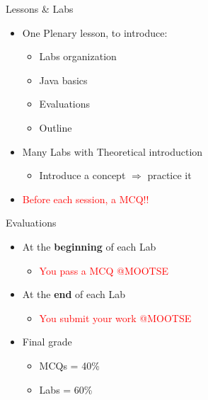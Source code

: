 \documentclass[English,t,%
hyperref={%
    pdftitle={FISA-DE2 OOP in Java},%
    pdfauthor={Guillaume Muller},%
    pdfsubject={OOP in Java},%
    pdfkeywords={OOP,Java}%
    },%
xcolor={pdftex,svgnames} %
]{beamer}
\begin{document}
\begin{frame}{Lessons \& Labs}

  \begin{itemize}
%
    \item One Plenary lesson, to introduce:
    \vspace{.5em}
    \begin{itemize}
      \item Labs organization
      \item Java basics
      \item Evaluations
      \item Outline
    \end{itemize}
%
    \vspace{2em}
    \item Many Labs with Theoretical introduction
    \vspace{.5em}
    \begin{itemize}
      \item Introduce a concept $\Rightarrow$ practice it
    \end{itemize}
%
    \vspace{2em}
    \item \textcolor{red}{Before each session, a MCQ!!}
%
  \end{itemize}

\end{frame}


\begin{frame}{Evaluations}

  \begin{itemize}
    \item At the \textbf{beginning} of each Lab
    \begin{itemize}
      \item \textcolor{red}{You pass a MCQ @MOOTSE}
    \end{itemize}
%
    \vspace{2em}
    \item At the \textbf{end} of each Lab
    \begin{itemize}
      \item \textcolor{red}{You submit your work @MOOTSE}
    \end{itemize}
%
    \vspace{2em}
    \item Final grade
    \begin{itemize}
      \item MCQs = 40\%
      \item Labs = 60\%
    \end{itemize}
%
  \end{itemize}

\end{frame}
\end{document}
